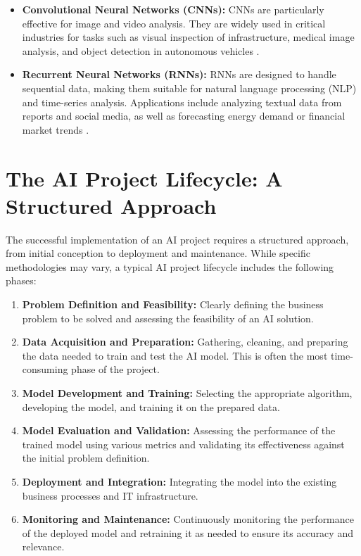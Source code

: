 \begin{itemize}
    \item \textbf{Convolutional Neural Networks (CNNs):} CNNs are particularly effective for image and video analysis. They are widely used in critical industries for tasks such as visual inspection of infrastructure, medical image analysis, and object detection in autonomous vehicles \parencite{Krizhevsky2012}.
    \item \textbf{Recurrent Neural Networks (RNNs):} RNNs are designed to handle sequential data, making them suitable for natural language processing (NLP) and time-series analysis. Applications include analyzing textual data from reports and social media, as well as forecasting energy demand or financial market trends \parencite{Hochreiter1997}.
\end{itemize}

\section{The AI Project Lifecycle: A Structured Approach}
\label{sec:ai_project_lifecycle}
The successful implementation of an AI project requires a structured approach, from initial conception to deployment and maintenance. While specific methodologies may vary, a typical AI project lifecycle includes the following phases:

\begin{enumerate}
    \item \textbf{Problem Definition and Feasibility:} Clearly defining the business problem to be solved and assessing the feasibility of an AI solution.
    \item \textbf{Data Acquisition and Preparation:} Gathering, cleaning, and preparing the data needed to train and test the AI model. This is often the most time-consuming phase of the project.
    \item \textbf{Model Development and Training:} Selecting the appropriate algorithm, developing the model, and training it on the prepared data.
    \item \textbf{Model Evaluation and Validation:} Assessing the performance of the trained model using various metrics and validating its effectiveness against the initial problem definition.
    \item \textbf{Deployment and Integration:} Integrating the model into the existing business processes and IT infrastructure.
    \item \textbf{Monitoring and Maintenance:} Continuously monitoring the performance of the deployed model and retraining it as needed to ensure its accuracy and relevance.
\end{enumerate}

